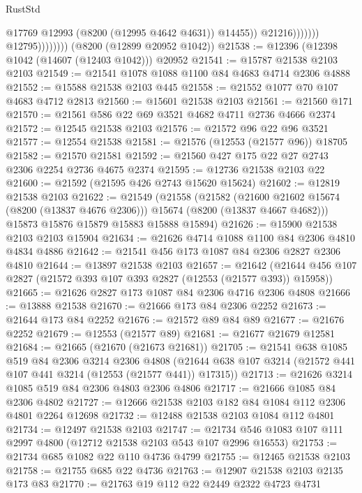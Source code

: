 \begin{lexlean}{RustStd}
\begin{coremodule}
                                      @17769
                                      @12993
                                      (@8200 (@12995 @4642 @4631))
                                      @14455))
                                  @21216)))))))
                    @12795))))))))
    (@8200 (@12899 @20952 @1042))
@21538 := @12396 (@12398 @1042 (@14607 (@12403 @1042))) @20952
@21541 := @15787 @21538 @2103 @2103
@21549 := @21541 @1078 @1088 @1100 @84 @4683 @4714 @2306 @4888
@21552 := @15588 @21538 @2103 @445
@21558 := @21552 @1077 @70 @107 @4683 @4712 @2813
@21560 := @15601 @21538 @2103
@21561 := @21560 @171
@21570 := @21561 @586 @22 @69 @3521 @4682 @4711 @2736 @4666 @2374
@21572 := @12545 @21538 @2103
@21576 := @21572 @96 @22 @96 @3521
@21577 := @12554 @21538
@21581 := @21576 (@12553 (@21577 @96)) @18705
@21582 := @21570 @21581
@21592 := @21560 @427 @175 @22 @27 @2743 @2306 @2254 @2736 @4675 @2374
@21595 := @12736 @21538 @2103 @22
@21600 := @21592 (@21595 @426 @2743 @15620 @15624)
@21602 := @12819 @21538 @2103
@21622 := @21549
    (@21558
      (@21582
        (@21600 @21602 @15674 (@8200 (@13837 @4676 @2306)))
        @15674
        (@8200 (@13837 @4667 @4682)))
      @15873
      @15876
      @15879
      @15883
      @15888
      @15894)
@21626 := @15900 @21538 @2103 @2103 @15904
@21634 := @21626 @4714 @1088 @1100 @84 @2306 @4810 @4834 @4886
@21642 := @21541 @456 @173 @1087 @84 @2306 @2827 @2306 @4810
@21644 := @13897 @21538 @2103
@21657 := @21642
    (@21644 @456 @107 @2827 (@21572 @393 @107 @393 @2827 (@12553 (@21577 @393)) @15958))
@21665 := @21626 @2827 @173 @1087 @84 @2306 @4716 @2306 @4808
@21666 := @13888 @21538
@21670 := @21666 @173 @84 @2306 @2252
@21673 := @21644 @173 @84 @2252
@21676 := @21572 @89 @84 @89
@21677 := @21676 @2252
@21679 := @12553 (@21577 @89)
@21681 := @21677 @21679 @12581
@21684 := @21665 (@21670 (@21673 @21681))
@21705 := @21541
    @638
    @1085
    @519
    @84
    @2306
    @3214
    @2306
    @4808
    (@21644 @638 @107 @3214 (@21572 @441 @107 @441 @3214 (@12553 (@21577 @441)) @17315))
@21713 := @21626 @3214 @1085 @519 @84 @2306 @4803 @2306 @4806
@21717 := @21666 @1085 @84 @2306 @4802
@21727 := @12666 @21538 @2103 @182 @84 @1084 @112 @2306 @4801 @2264 @12698
@21732 := @12488 @21538 @2103 @1084 @112 @4801
@21734 := @12497 @21538 @2103
@21747 := @21734 @546 @1083 @107 @111 @2997 @4800 (@12712 @21538 @2103 @543 @107 @2996 @16553)
@21753 := @21734 @685 @1082 @22 @110 @4736 @4799
@21755 := @12465 @21538 @2103
@21758 := @21755 @685 @22 @4736
@21763 := @12907 @21538 @2103 @2135 @173 @83
@21770 := @21763 @19 @112 @22 @2449 @2322 @4723 @4731

\end{coremodule}
\end{lexlean}
